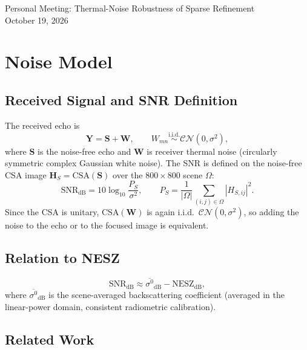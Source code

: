 \documentclass[11pt,a4paper]{article}
\theoremstyle{definition}
\begin{document}
\begin{center}
{\LARGE Personal Meeting: Thermal-Noise Robustness of Sparse Refinement}\\[0.4em]
{\large October 19, 2026}
\end{center}

\section{Noise Model}

\subsection{Received Signal and SNR Definition}

The received echo is
\begin{equation}\label{eq:y}
  \mathbf Y = \mathbf S + \mathbf W,\qquad W_{mn} \overset{\text{i.i.d.}}{\sim} \mathcal{CN}(0,\sigma^2),
\end{equation}
where $\mathbf S$ is the noise-free echo and $\mathbf W$ is receiver thermal noise
(circularly symmetric complex Gaussian white noise). The SNR is defined on the noise-free
CSA image $\mathbf H_S = \mathrm{CSA}(\mathbf S)$ over the $800\times800$ scene $\Omega$:
\begin{equation}\label{eq:snr}
  \mathrm{SNR}_{\mathrm{dB}} = 10\log_{10}\frac{P_S}{\sigma^2},\qquad
  P_S = \frac{1}{|\Omega|}\sum_{(i,j)\in\Omega} |H_{S,ij}|^2 .
\end{equation}
Since the CSA is unitary, $\mathrm{CSA}(\mathbf W)$ is again i.i.d.\ $\mathcal{CN}(0,\sigma^2)$, so
adding the noise to the echo or to the focused image is equivalent.

\subsection{Relation to NESZ}

\begin{equation}\label{eq:nesz}
  \mathrm{SNR}_{\mathrm{dB}} \approx \overline{\sigma^0}_{\mathrm{dB}} - \mathrm{NESZ}_{\mathrm{dB}},
\end{equation}
where $\overline{\sigma^0}_{\mathrm{dB}}$ is the scene-averaged backscattering coefficient (averaged in
the linear-power domain, consistent radiometric calibration).

\subsection{Related Work}
\end{document}
